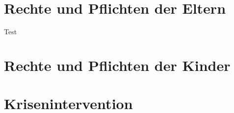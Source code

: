 \documentclass{ejsreport}
\begin{document}



\section{Rechte und Pflichten der Eltern}

Test \autocite[Vgl.][]{Albrecht2019}

\section{Rechte und Pflichten der Kinder}

\section{Krisenintervention}

\printbibliography
\end{document}
